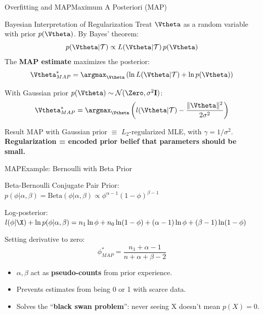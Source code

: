 \begin{frame}{Overfitting and MAP}{Maximum A Posteriori (MAP)}
  \begin{block}{Bayesian Interpretation of Regularization}
    Treat $\Vtheta$ as a random variable with prior $p(\Vtheta)$. By Bayes' theorem:
    \[
      p(\Vtheta|\mathcal{T}) \propto L(\Vtheta|\mathcal{T})\,p(\Vtheta)
    \]
    The \textbf{MAP estimate} maximizes the posterior:
    \[
      \Vtheta^*_{MAP} = \argmax_{\Vtheta}\left(\ln L(\Vtheta|\mathcal{T}) + \ln p(\Vtheta)\right)
    \]
  \end{block}

  With Gaussian prior $p(\Vtheta) \sim \mathcal{N}(\Zero,\sigma^2\mathbf{I})$:
  \[
    \Vtheta^*_{MAP} = \argmax_{\Vtheta}\left(l(\Vtheta|\mathcal{T}) - \frac{\|\Vtheta\|^2}{2\sigma^2}\right)
  \]

  \begin{exampleblock}{Result}
    MAP with Gaussian prior $\equiv$ $L_2$-regularized MLE, with $\gamma = 1/\sigma^2$.\\
    \textbf{Regularization = encoded prior belief that parameters should be small.}
  \end{exampleblock}
\end{frame}

\begin{frame}{MAP}{Example: Bernoulli with Beta Prior}
  \begin{exampleblock}{Beta-Bernoulli Conjugate Pair}
    Prior: $p(\phi|\alpha,\beta) = \mathrm{Beta}(\phi|\alpha,\beta) \propto \phi^{\alpha-1}(1-\phi)^{\beta-1}$

    Log-posterior: $l(\phi|\X) + \ln p(\phi|\alpha,\beta) = n_1\ln\phi + n_0\ln(1-\phi) + (\alpha-1)\ln\phi + (\beta-1)\ln(1-\phi)$

    Setting derivative to zero:
    \[
      \phi^*_{MAP} = \frac{n_1 + \alpha - 1}{n + \alpha + \beta - 2}
    \]

    \begin{itemize}
      \item $\alpha, \beta$ act as \textbf{pseudo-counts} from prior experience.
      \item Prevents estimates from being 0 or 1 with scarce data.
      \item Solves the ``\textbf{black swan problem}'': never seeing X doesn't mean $p(X)=0$.
    \end{itemize}
  \end{exampleblock}
\end{frame}

